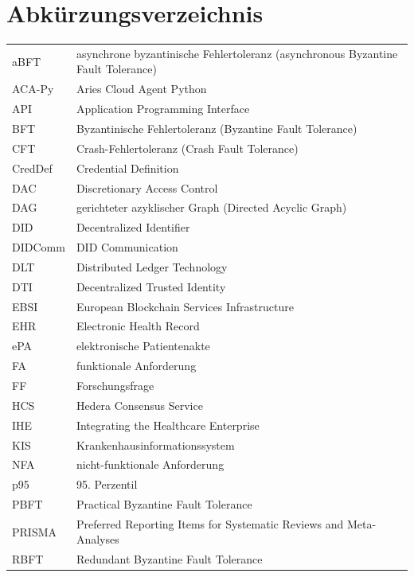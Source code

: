 \chapter*{Abkürzungsverzeichnis}
\begin{center}
\renewcommand{\arraystretch}{1.15}
\begin{tabular}{@{}p{}p{}@{}}
    aBFT & asynchrone byzantinische Fehlertoleranz (asynchronous Byzantine Fault Tolerance) \\
    ACA-Py & Aries Cloud Agent Python \\
    API & Application Programming Interface \\
    BFT & Byzantinische Fehlertoleranz (Byzantine Fault Tolerance) \\
    CFT & Crash-Fehlertoleranz (Crash Fault Tolerance) \\
    CredDef & Credential Definition \\
    DAC & Discretionary Access Control \\
    DAG & gerichteter azyklischer Graph (Directed Acyclic Graph) \\
    DID & Decentralized Identifier \\
    DIDComm & DID Communication \\
    DLT & Distributed Ledger Technology \\
    DTI & Decentralized Trusted Identity \\
    EBSI & European Blockchain Services Infrastructure \\
    EHR & Electronic Health Record \\
    ePA & elektronische Patientenakte \\
    FA & funktionale Anforderung \\
    FF & Forschungsfrage \\
    HCS & Hedera Consensus Service \\
    IHE & Integrating the Healthcare Enterprise \\
    KIS & Krankenhausinformationssystem \\
    NFA & nicht-funktionale Anforderung \\
    p95 & 95. Perzentil \\
    PBFT & Practical Byzantine Fault Tolerance \\
    PRISMA & Preferred Reporting Items for Systematic Reviews and Meta-Analyses \\
    RBFT & Redundant Byzantine Fault Tolerance \\

\end{tabular}
\end{center}
